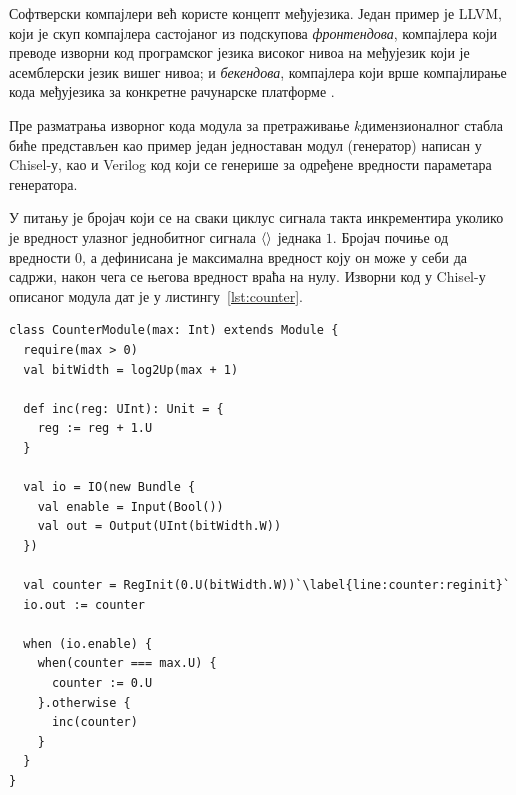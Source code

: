 \documentclass[master]{finthesis}
\newcommand*{\kdim}[1]{\texorpdfstring{$k$\Hyphdash}{k-}димензионал#1}
\newcommand*{\correctmath}[1]{%
    \ifcsname mathCorrectionFor#1\endcsname%
        \csname mathCorrectionFor#1\endcsname%
    \else%
        #1%
    \fi%
}
\newcommand*{\mfield}[1]{{\langle\correctmath{#1}\/\rangle}}
\newcommand*{\field}[1]{\texorpdfstring{$\mfield{#1}$}{⟨#1⟩}}
\begin{document}
Софтверски компајлери већ користе концепт међујезика. Један пример је LLVM, који је скуп компајлера састојаног из подскупова \emph{фронтендова}, компајлера који преводе изворни код програмског језика високог нивоа на међујезик који је асемблерски језик вишег нивоа; и \emph{бекендова}, компајлера који врше компајлирање кода међујезика за конкретне рачунарске платформе \cite{llvm}.

Пре разматрања изворног кода модула за претраживање \kdim{ног} стабла биће представљен као пример један једноставан модул (генератор) написан у Chisel-у, као и Verilog код који се генерише за одређене вредности параметара генератора.

У питању је бројач који се на сваки циклус сигнала такта инкрементира уколико је вредност улазног једнобитног сигнала \field{enable} једнака $1$. Бројач почиње од вредности $0$, а дефинисана је максимална вредност коју он може у себи да садржи, након чега се његова вредност враћа на нулу. Изворни код у Chisel-у описаног модула дат је у листингу~\ref{lst:counter}.

\begin{lstlisting}[style=Chisel, caption={Реализација бројача у Chisel-у са параметром \field{max} који одређује максималну вредност тог бројача.}, label={lst:counter}]
class CounterModule(max: Int) extends Module {
  require(max > 0)
  val bitWidth = log2Up(max + 1)

  def inc(reg: UInt): Unit = {
    reg := reg + 1.U
  }

  val io = IO(new Bundle {
    val enable = Input(Bool())
    val out = Output(UInt(bitWidth.W))
  })

  val counter = RegInit(0.U(bitWidth.W))`\label{line:counter:reginit}`
  io.out := counter

  when (io.enable) {
    when(counter === max.U) {
      counter := 0.U
    }.otherwise {
      inc(counter)
    }
  }
}
\end{lstlisting}
\end{document}
